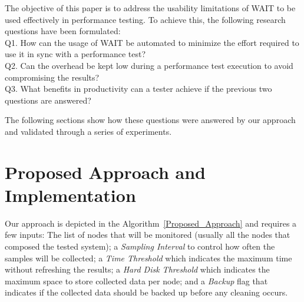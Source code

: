 \documentclass[runningheads,a4paper]{llncs}
\begin{document}
The objective of this paper is to address the usability limitations of WAIT to
be used effectively in performance testing. To achieve this, the following
research questions have been formulated:
\\Q1. How can the usage of WAIT be automated to minimize the effort
required to use it in sync with a performance test?
\\Q2. Can the overhead be kept low during a performance test execution to avoid
compromising the results?
\\Q3. What benefits in productivity can a tester achieve if the previous
two questions are answered?

The following sections show how these questions were answered by our approach
and validated through a series of experiments.

\vspace{-5pt}
\section{Proposed Approach and Implementation}
\vspace{-5pt}

Our approach is depicted in the Algorithm~\ref{Proposed_Approach} and requires
a few inputs: The list of nodes that will be monitored (usually all the nodes
that composed the tested system); a \emph{Sampling Interval} to control how
often the samples will be collected; a \emph{Time Threshold} which indicates the
maximum time without refreshing the results; a \emph{Hard Disk Threshold} which
indicates the maximum space to store collected data per node; and a
\emph{Backup} flag that indicates if the collected data should be backed up
before any cleaning occurs.
\end{document}
